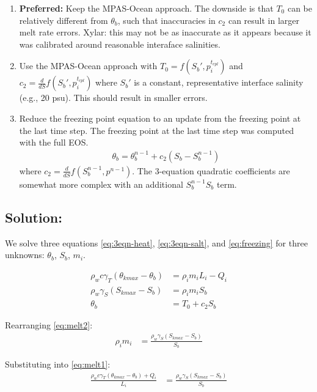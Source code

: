 \documentclass[11pt]{report}
\newcommand{\bea}{\begin{eqnarray}}
\newcommand{\eea}{\end{eqnarray}}
\begin{document}
\begin{enumerate}
    \item \textbf{Preferred:} Keep the MPAS-Ocean approach. The downside is that $T_0$ can be relatively different from $\theta_b$, such that inaccuracies in $c_2$ can result in larger melt rate errors. Xylar: this may not be as inaccurate as it appears because it was calibrated around reasonable interaface salinities.
    \item Use the MPAS-Ocean approach with $T_0 = f(S_b', p_i^{t_{cpl}})$ and $c_2 = \frac{d}{dS} f(S_b', p_i^{t_{cpl}})$ where $S_b'$ is a constant, representative interface salinity (e.g., 20 psu). This should result in smaller errors.
    \item Reduce the freezing point equation to an update from the freezing point at the last time step. The freezing point at the last time step was computed with the full EOS.
    \bea
        \theta_b = \theta_b^{n-1} + c_2(S_b - S_b^{n-1})
    \eea
    where $c_2 = \frac{d}{dS} f(S_b^{n-1}, p^{n-1})$. The 3-equation quadratic coefficients are somewhat more complex with an additional $S_b^{n-1} S_b$ term.
\end{enumerate}

\subsection{Solution:}
We solve three equations \ref{eq:3eqn-heat}, \ref{eq:3eqn-salt}, and \ref{eq:freezing} for three unknowns: $\theta_b$, $S_b$, $m_i$.

\begin{align}
\rho_w c \gamma_T (\theta_{kmax} - \theta_b) &= \rho_i m_i L_i - Q_i \label{eq:melt1} \\
\rho_w \gamma_S (S_{kmax} - S_b) &= \rho_i m_i S_b \label{eq:melt2} \\
\theta_b &= T_0 + c_2 S_b  \label{eq:melt3}
\end{align}


\noindent
Rearranging \ref{eq:melt2}:
\begin{align}
\rho_i m_i &= \frac{\rho_w \gamma_S (S_{kmax} - S_b)}{S_b} \label{eq:melt2_rearranged}
\end{align}

Substituting \label{eq:melt2_rearranged} into \ref{eq:melt1}:
\begin{align}
\frac{\rho_w c \gamma_T (\theta_{kmax} - \theta_b) + Q_i}{L_i}
    &= \frac{\rho_w \gamma_S (S_{kmax} - S_b)}{S_b}  \label{eq:melt1_sub}
\end{align}
\end{document}
